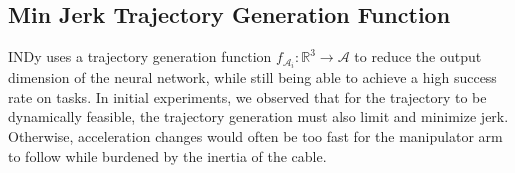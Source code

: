 \subsection{Min Jerk Trajectory Generation Function}\label{ssec:min-jerk}



INDy uses a trajectory generation function $f_{\mathcal{A}_i} : \mathbb{R}^3 \rightarrow \mathcal{A}$ to reduce the output dimension of the neural network, %
while still being able to achieve a high success rate on tasks.  In initial experiments, we observed that for the trajectory to be dynamically feasible, the trajectory generation must also limit and minimize jerk.  Otherwise, acceleration changes would often be too fast for the manipulator arm to follow while burdened by the inertia of the cable.

